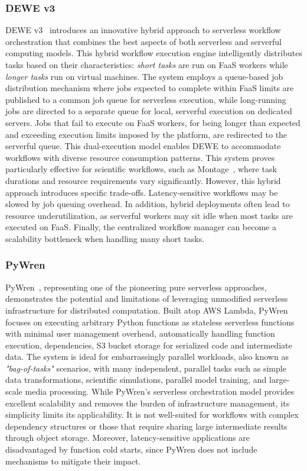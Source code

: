 \begin{itemize}
\subsubsection{DEWE v3}
DEWE v3~\cite{dewe_v3} introduces an innovative hybrid approach to serverless workflow orchestration that combines the best aspects of both serverless and serverful computing models. This hybrid workflow execution engine intelligently distributes tasks based on their characteristics: \textit{short tasks} are run on FaaS workers while \textit{longer tasks} run on virtual machines. The system employs a queue-based job distribution mechanism where jobs expected to complete within FaaS limits are published to a common job queue for serverless execution, while long-running jobs are directed to a separate queue for local, serverful execution on dedicated servers. Jobs that fail to execute on FaaS workers, for being longer than expected and exceeding execution limits imposed by the platform, are redirected to the serverful queue. This dual-execution model enables DEWE to accommodate workflows with diverse resource consumption patterns. This system proves particularly effective for scientific workflows, such as Montage~\cite{montage_astronomy}, where task durations and resource requirements vary significantly. However, this hybrid approach introduces specific trade-offs. Latency-sensitive workflows may be slowed by job queuing overhead. In addition, hybrid deployments often lead to resource underutilization, as serverful workers may sit idle when most tasks are executed on FaaS. Finally, the centralized workflow manager can become a scalability bottleneck when handling many short tasks.

\subsubsection{PyWren}
PyWren~\cite{pywren}, representing one of the pioneering pure serverless approaches, demonstrates the potential and limitations of leveraging unmodified serverless infrastructure for distributed computation. Built atop AWS Lambda, PyWren focuses on executing arbitrary Python functions as stateless serverless functions with minimal user management overhead, automatically handling function execution, dependencies, S3 bucket storage for serialized code and intermediate data. The system is ideal for embarrassingly parallel workloads, also known as \textit{"bag-of-tasks"} scenarios, with many independent, parallel tasks such as simple data transformations, scientific simulations, parallel model training, and large-scale media processing. While PyWren’s serverless orchestration model provides excellent scalability and removes the burden of infrastructure management, its simplicity limits its applicability. It is not well-suited for workflows with complex dependency structures or those that require sharing large intermediate results through object storage. Moreover, latency-sensitive applications are disadvantaged by function cold starts, since PyWren does not include mechanisms to mitigate their impact.


\end{itemize}

